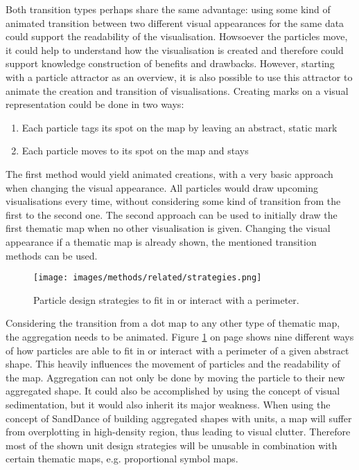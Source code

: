 Both transition types perhaps share the same advantage: using some kind of animated transition between two different visual appearances for the same data could support the readability of the visualisation. Howsoever the particles move, it could help to understand how the visualisation is created and therefore could support knowledge construction of benefits and drawbacks.
However, starting with a particle attractor as an overview, it is also possible to use this attractor to animate the creation and transition of visualisations. Creating marks on a visual representation could be done in two ways:

\begin{enumerate}
\item Each particle tags its spot on the map by leaving an abstract, static mark
\item Each particle moves to its spot on the map and stays
\end{enumerate}

The first method would yield animated creations, with a very basic approach when changing the visual appearance. All particles would draw upcoming visualisations every time, without considering some kind of transition from the first to the second one. The second approach can be used to initially draw the first thematic map when no other visualisation is given. Changing the visual appearance if a thematic map is already shown, the mentioned transition methods can be used.

\begin{figure}[!htb]
\centering
\texttt{[image: images/methods/related/strategies.png]}
\caption[
    Particle design strategies to fit in or interact with a perimeter.
]{Particle design strategies to fit in or interact with a perimeter.}
\label{fig:particle-design-strategies}
\end{figure}

Considering the transition from a dot map to any other type of thematic map, the aggregation needs to be animated. Figure \ref{fig:particle-design-strategies} on page \pageref{fig:particle-design-strategies} shows nine different ways of how particles are able to fit in or interact with a perimeter of a given abstract shape. This heavily influences the movement of particles and the readability of the map. Aggregation can not only be done by moving the particle to their new aggregated shape. It could also be accomplished by using the concept of visual sedimentation, but it would also inherit its major weakness. When using the concept of SandDance of building aggregated shapes with units, a map will suffer from overplotting in high-density region, thus leading to visual clutter. Therefore most of the shown unit design strategies will be unusable in combination with certain thematic maps, e.g. proportional symbol maps.

